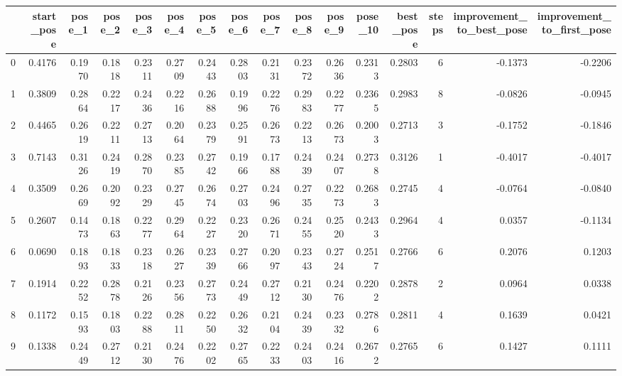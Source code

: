 \begin{tabular}{lrrrrrrrrrrrrrrr}
\toprule
{} &  start\_pose &  pose\_1 &  pose\_2 &  pose\_3 &  pose\_4 &  pose\_5 &  pose\_6 &  pose\_7 &  pose\_8 &  pose\_9 &  pose\_10 &  best\_pose &  steps &  improvement\_to\_best\_pose &  improvement\_to\_first\_pose \\
\midrule
0   &      0.4176 &  0.1970 &  0.1818 &  0.2311 &  0.2709 &  0.2443 &  0.2803 &  0.2131 &  0.2372 &  0.2636 &   0.2313 &     0.2803 &      6 &                   -0.1373 &                    -0.2206 \\
1   &      0.3809 &  0.2864 &  0.2217 &  0.2436 &  0.2216 &  0.2688 &  0.1996 &  0.2276 &  0.2983 &  0.2277 &   0.2365 &     0.2983 &      8 &                   -0.0826 &                    -0.0945 \\
2   &      0.4465 &  0.2619 &  0.2211 &  0.2713 &  0.2064 &  0.2379 &  0.2591 &  0.2673 &  0.2213 &  0.2673 &   0.2003 &     0.2713 &      3 &                   -0.1752 &                    -0.1846 \\
3   &      0.7143 &  0.3126 &  0.2419 &  0.2870 &  0.2385 &  0.2742 &  0.1966 &  0.1788 &  0.2439 &  0.2407 &   0.2738 &     0.3126 &      1 &                   -0.4017 &                    -0.4017 \\
4   &      0.3509 &  0.2669 &  0.2092 &  0.2329 &  0.2745 &  0.2674 &  0.2703 &  0.2496 &  0.2735 &  0.2273 &   0.2683 &     0.2745 &      4 &                   -0.0764 &                    -0.0840 \\
5   &      0.2607 &  0.1473 &  0.1863 &  0.2277 &  0.2964 &  0.2227 &  0.2320 &  0.2671 &  0.2455 &  0.2520 &   0.2433 &     0.2964 &      4 &                    0.0357 &                    -0.1134 \\
6   &      0.0690 &  0.1893 &  0.1833 &  0.2318 &  0.2627 &  0.2339 &  0.2766 &  0.2097 &  0.2343 &  0.2724 &   0.2517 &     0.2766 &      6 &                    0.2076 &                     0.1203 \\
7   &      0.1914 &  0.2252 &  0.2878 &  0.2126 &  0.2356 &  0.2773 &  0.2449 &  0.2712 &  0.2130 &  0.2476 &   0.2202 &     0.2878 &      2 &                    0.0964 &                     0.0338 \\
8   &      0.1172 &  0.1593 &  0.1803 &  0.2288 &  0.2811 &  0.2250 &  0.2632 &  0.2104 &  0.2439 &  0.2332 &   0.2786 &     0.2811 &      4 &                    0.1639 &                     0.0421 \\
9   &      0.1338 &  0.2449 &  0.2712 &  0.2130 &  0.2476 &  0.2202 &  0.2765 &  0.2233 &  0.2403 &  0.2416 &   0.2672 &     0.2765 &      6 &                    0.1427 &                     0.1111 \\

\end{tabular}
